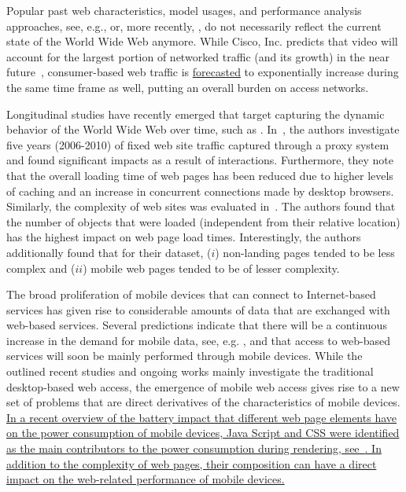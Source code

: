 \documentclass[onecolumn,12pt]{IEEEtran}
\begin{document}
Popular past web characteristics, model usages, and performance analysis approaches, see, e.g., \cite{BaCr98} or, more recently, \cite{LiZhZhChGr10}, do  not necessarily reflect the current state of the World Wide Web anymore.
While Cisco, Inc. predicts that video will account for the largest portion of networked traffic (and its growth) in the near future~\cite{Ci13}, consumer-based web traffic is \uline{forecasted} to exponentially increase during the same time frame as well, putting an overall burden on access networks.

Longitudinal studies have recently emerged that target capturing the dynamic behavior of the World Wide Web over time, such as \cite{CaAlPa10}.
In~\cite{IhPa11}, the authors investigate five years (2006-2010) of fixed web site traffic captured through a proxy system and found significant impacts as a result of interactions.
Furthermore, they note that the overall loading time of web pages has been reduced due to higher levels of caching and an increase in concurrent connections made by desktop browsers.
Similarly, the complexity of web sites was evaluated in~\cite{BuMaSe11,BuMaSe13}. The authors found that the number of objects that were loaded (independent from their relative location) has the highest impact on web page load times.
Interestingly, the authors additionally found that for their dataset, ($i$) non-landing pages tended to be less complex and ($ii$) mobile web pages tended to be of lesser complexity.


The broad proliferation of mobile devices that can connect to Internet-based services has given rise to considerable amounts of data that are exchanged with web-based services. 
Several predictions indicate that there will be a continuous increase in the demand for mobile data, see, e.g. \cite{Ci13}, and that access to web-based services will soon be mainly performed through mobile devices.
While the outlined recent studies and ongoing works mainly investigate the traditional desktop-based web access, the emergence of mobile web access gives rise to a new set of problems that are direct derivatives of the characteristics of mobile devices.
\uline{In a recent overview of the battery impact that different web page elements have on the power consumption of mobile devices, Java Script and CSS were identified as the main contributors to the power consumption during rendering, see~\cite{ThAgNiBoSi12}.
In addition to the complexity of web pages, their composition can have a direct impact on the web-related performance of mobile devices.}
\end{document}
